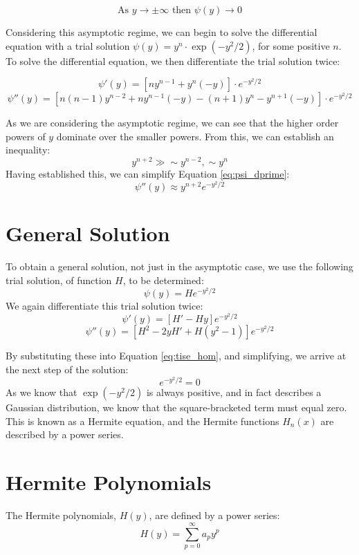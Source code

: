 \documentclass[a4paper]{article}
\begin{document}
\begin{equation}
\text{As }y\rightarrow\pm\infty \text{ then } \psi(y)\rightarrow 0
\end{equation}

Considering this asymptotic regime, we can begin to solve the differential equation with a trial solution $\psi(y)=y^n\cdot\exp(-y^2/2)$, for some positive $n$.  To solve the differential equation, we then differentiate the trial solution twice:

\begin{equation} \label{eq:psi_prime}
\psi'(y)= [ny^{n-1}+y^n(-y)]\cdot e^{-y^2/2}
\end{equation}
\begin{equation} \label{eq:psi_dprime}
\psi''(y)=[n(n-1)y^{n-2}+ny^{n-1}(-y)-(n+1)y^n-y^{n+1}(-y)]\cdot e^{-y^2/2}
\end{equation}

As we are considering the asymptotic regime, we can see that the higher order powers of $y$ dominate over the smaller powers. From this, we can establish an inequality:
\begin{equation}
y^{n+2}\gg\sim y^{n-2}, \sim y^n
\end{equation}
Having established this, we can simplify Equation \ref{eq:psi_dprime}:
\begin{equation}
\psi''(y)\approx y^{n+2}e^{-y^2/2}
\end{equation}

\section{General Solution}

To obtain a general solution, not just in the asymptotic case, we use the following trial solution, of function $H$, to be determined:
\begin{equation}
\psi(y)=He^{-y^2/2}
\end{equation}
We again differentiate this trial solution twice:
\begin{equation}
\psi'(y)=[H'-Hy]e^{-y^2/2}
\end{equation}
\begin{equation}
\psi''(y)=[H^2-2yH'+H(y^2-1)]e^{-y^2/2}
\end{equation}

By substituting these into Equation \ref{eq:tise_hom}, and simplifying, we arrive at the next step of the solution:
\begin{equation}
[H''=2yH'+(\varepsilon -1)H]e^{-y^2/2}=0
\end{equation}
As we know that $\exp(-y^2/2)$ is always positive, and in fact describes a Gaussian distribution, we know that the square-bracketed term must equal zero. This is known as a Hermite equation, and the Hermite functions $H_n(x)$ are described by a power series.

\section{Hermite Polynomials}
The Hermite polynomials, $H(y)$, are defined by a power series:
\begin{equation}
H(y)=\sum_{p=0}^\infty a_py^p
\end{equation}

\end{document}
